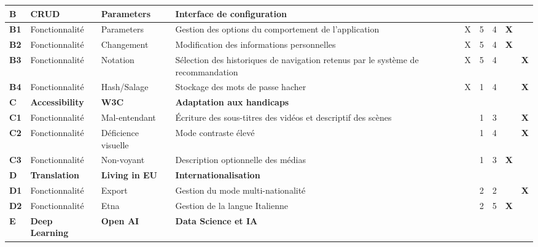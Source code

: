 \documentclass[12pt]{article}
\begin{document}
\begin{landscape}
\begin{table}[H]
{\begin{tabular}{p{1cm}p{2cm}p{3cm}p{10cm}p{1.75cm}p{1.5cm}p{1.25cm}p{.5cm}p{.5cm}}
\hline  	\bf B\cellcolor{gray!50}& \bf CRUD\cellcolor{gray!50}& \bf Parameters\cellcolor{gray!50}& \bf Interface de configuration\cellcolor{gray!50}& \cellcolor{gray!50} & \cellcolor{gray!50} &  \cellcolor{gray!50} & \cellcolor{gray!50} &  \cellcolor{gray!50}\\
\hline  	\bf B1& Fonctionnalité & Parameters & Gestion des options du comportement de l’application & X & 5 &  4 & \bf X & \\
\hline  	\bf B2& Fonctionnalité & Changement & Modification des informations personnelles & X & 5 &  4 & \bf X & \\
\hline  	\bf B3& Fonctionnalité & Notation & Sélection des historiques de navigation retenus par le système de recommandation & X & 5 & 4 &  & \bf X \\
\hline  	\bf B4& Fonctionnalité & Hash/Salage & Stockage des mots de passe hacher & X & 1 & 4 &  & \bf X \\
\hline  	\bf C\cellcolor{gray!50}& \bf Accessibility\cellcolor{gray!50}& \bf W3C\cellcolor{gray!50}& \bf Adaptation aux handicaps\cellcolor{gray!50}& \cellcolor{gray!50} & \cellcolor{gray!50} &  \cellcolor{gray!50} & \cellcolor{gray!50} &  \cellcolor{gray!50}\\
\hline  	\bf C1& Fonctionnalité & Mal-entendant & Écriture des sous-titres des vidéos et descriptif des scènes &  & 1 &  3 &  & \bf X\\
\hline  	\bf C2& Fonctionnalité & Déficience visuelle & Mode contraste élevé &  & 1 &  4 &  & \bf X \\
\hline  	\bf C3& Fonctionnalité & Non-voyant & Description optionnelle des médias &  & 1 &  3 & \bf X & \\
\hline  	\bf D\cellcolor{gray!50}& \bf Translation\cellcolor{gray!50}& \bf Living in EU\cellcolor{gray!50}& \bf Internationalisation\cellcolor{gray!50}& \cellcolor{gray!50} & \cellcolor{gray!50} &  \cellcolor{gray!50} & \cellcolor{gray!50} &  \cellcolor{gray!50}\\
\hline  	\bf D1& Fonctionnalité & Export & Gestion du mode multi-nationalité &  & 2 &  2 &  & \bf X \\
\hline  	\bf D2& Fonctionnalité & Etna & Gestion de la langue Italienne &  & 2 &  5 & \bf X & \\
\hline  	\bf E\cellcolor{gray!50}& \bf Deep Learning\cellcolor{gray!50}& \bf Open AI \cellcolor{gray!50}& \bf Data Science et IA\cellcolor{gray!50}& \cellcolor{gray!50} & \cellcolor{gray!50} &  \cellcolor{gray!50} & \cellcolor{gray!50} &  \cellcolor{gray!50}\\

\end{tabular}}
\end{table}
\end{landscape}
\end{document}
